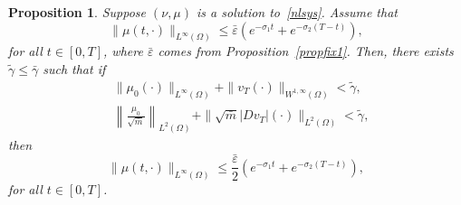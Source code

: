 \documentclass[10pt,a4paper,nouppercase,nowrite]{article}
\numberwithin{equation}{section}
\newcommand{\eps}{\varepsilon}
\newtheorem{prop}[defn]{Proposition}
\theoremstyle{definition}
\begin{document}
	\begin{prop} \label{propfix2}
		Suppose $(\nu,\mu)$ is a solution to~\eqref{nlsys}. Assume that
		\begin{equation}
			\|\mu(t,\cdot)\|_{L^{\infty}(\Omega)} \le \bar{\eps} \left( e^{-\sigma_1 t} + e^{-\sigma_2(T-t)} \right),
			\label{cond3}
		\end{equation}
		for all $t \in [0,T]$, where $\bar{\eps}$ comes from Proposition~\ref{propfix1}. Then, there exists $\tilde{\gamma} \le \bar{\gamma}$ such that if
			\begin{align}
			&\|\mu_0(\cdot)\|_{L^{\infty}(\Omega)} + \|v_T(\cdot)\|_{W^{1,\infty}(\Omega)} < \tilde{\gamma}, 
			\label{cond4} \\
			&\left\| \frac{\mu_0}{\sqrt{\bar{m}}} \right\|_{L^{2}(\Omega)} + \|\sqrt{\bar{m}} |Dv_T|(\cdot)\|_{L^2(\Omega)} < \tilde{\gamma},
			\label{cond5}
			\end{align}
		then
		\begin{equation}
			\|\mu(t,\cdot)\|_{L^{\infty}(\Omega)} \le \frac{\bar{\eps}}{2} \left( e^{-\sigma_1 t} + e^{-\sigma_2(T-t)} \right),
			\label{estmu}
		\end{equation}
		for all $t \in [0,T]$.
	\end{prop}
\end{document}
